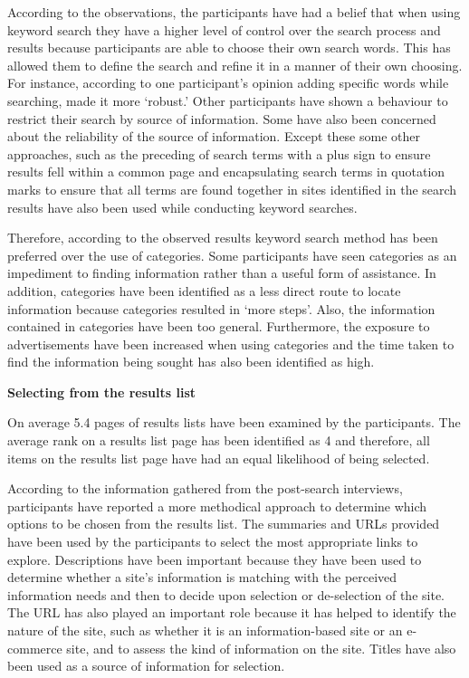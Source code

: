 \documentclass[]{article}
\begin{document}
According to the observations, the participants have had a belief that when using keyword search they have a higher level of control over the search process and results because participants are able to choose their own search words. This has allowed them to define the search and refine it in a manner of their own choosing. For instance, according to one participant’s opinion adding specific words while searching, made it more ‘robust.’ Other participants have shown a behaviour to restrict their search by source of information. Some have also been concerned about the reliability of the source of information. Except these some other approaches, such as the preceding of search terms with a plus sign to ensure results fell within a common page and encapsulating search terms in quotation marks to ensure that all terms are found together in sites identified in the search results     have also been used while conducting keyword searches.            

Therefore, according to the observed results keyword search method has been preferred over the use of categories. Some participants have seen categories as an impediment to finding information rather than a useful form of assistance. In addition, categories have been identified as a less direct route to locate information because categories resulted in ‘more steps’. Also, the information contained in categories have been too general. Furthermore, the exposure to advertisements have been increased when using categories and the time taken to find the information being sought has also been identified as high.         

\textbf{Selecting from the results list}

On average 5.4 pages of results lists have been examined by the participants. The average rank on a results list page has been identified as 4 and therefore, all items on the results list page have had an equal likelihood of being selected. 

According to the information gathered from the post-search interviews, participants have reported a more methodical approach to determine which options to be chosen from the results list. The summaries and URLs provided have been used by the participants to select the most appropriate links to explore. Descriptions have been important because they have been used to determine whether a site’s information is matching with the perceived information needs and then to decide upon selection or de-selection of the site. The URL has also played an important role because it has helped to identify the nature of the site, such as whether it is an information-based site or an e-commerce site, and to assess the kind of information on the site. Titles have also been used as a source of information for selection.   
  
\end{document}
